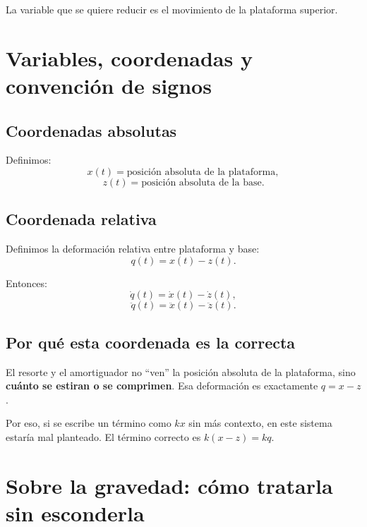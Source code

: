 \documentclass[11pt]{article}
\begin{document}
La variable que se quiere reducir es el movimiento de la plataforma superior.

\section{Variables, coordenadas y convenci\'on de signos}

\subsection{Coordenadas absolutas}

Definimos:
\begin{equation}
x(t) = \text{posici\'on absoluta de la plataforma},
\end{equation}
\begin{equation}
z(t) = \text{posici\'on absoluta de la base}.
\end{equation}

\subsection{Coordenada relativa}

Definimos la deformaci\'on relativa entre plataforma y base:
\begin{equation}
q(t) = x(t) - z(t).
\label{eq:q}
\end{equation}

Entonces:
\begin{equation}
\dot q(t) = \dot x(t) - \dot z(t),
\end{equation}
\begin{equation}
\ddot q(t) = \ddot x(t) - \ddot z(t).
\end{equation}

\subsection{Por qu\'e esta coordenada es la correcta}

El resorte y el amortiguador no ``ven'' la posici\'on absoluta de la plataforma, sino \textbf{cu\'anto se estiran o se comprimen}. Esa deformaci\'on es exactamente $q=x-z$.

Por eso, si se escribe un t\'ermino como $kx$ sin m\'as contexto, en este sistema estar\'ia mal planteado. El t\'ermino correcto es $k(x-z)=kq$.

\section{Sobre la gravedad: c\'omo tratarla sin esconderla}
\end{document}
